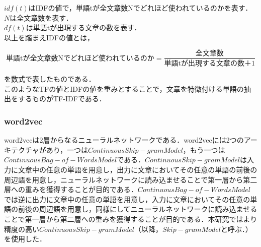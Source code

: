 $ idf(t) $はIDFの値で，単語tが全文章数Nでどれほど使われているのかを表す．\\
$ N $は全文章数を表す．\\
$ df(t) $は単語tが出現する文章の数を表す．\\
以上を踏まえIDFの値とは，

\[
\mbox{単語tが全文章数Nでどれほど使われているのか} = \frac{\mbox{全文章数}}{\mbox{単語tが出現する文章の数}＋1}
\]

を数式で表したものである．\\
このようなTFの値とIDFの値を重みとすることで，文章を特徴付ける単語の抽出をするものがTF-IDFである．


\subsubsection{word2vec}
\label{tech:word2vec}
word2vecは2層からなるニューラルネットワークである．word2vecには2つのアーキテクチャがあり，一つは$ Continuous Skip-gram Model $，もう一つは$ Continuous Bag-of-Words Model $である．$ Continuous Skip-gram Model $は入力に文章中の任意の単語を用意し，出力に文章においてその任意の単語の前後の周辺語を用意し，ニューラルネットワークに読み込ませることで第一層から第二層への重みを獲得することが目的である．$ Continuous Bag-of-Words Model $では逆に出力に文章中の任意の単語を用意し，入力に文章においてその任意の単語の前後の周辺語を用意し，同様にしてニューラルネットワークに読み込ませることで第一層から第二層への重みを獲得することが目的である．本研究ではより精度の高い$ Continuous Skip-gram Model $（以降，$ Skip-gram Model $と呼ぶ．）を使用した．\cite{word2vecpaper}

